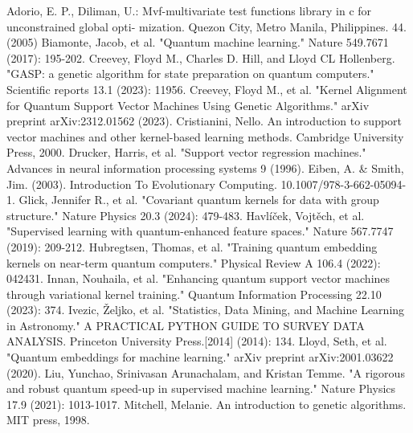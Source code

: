 \documentclass[12pt]{article}
\begin{document}
\begin{thebibliography}{9}

    Adorio, E. P., Diliman, U.: Mvf-multivariate test functions library in c for unconstrained global opti-
mization. Quezon City, Metro Manila, Philippines. 44. (2005)
    Biamonte, Jacob, et al. "Quantum machine learning." Nature 549.7671 (2017): 195-202.
    Creevey, Floyd M., Charles D. Hill, and Lloyd CL Hollenberg. "GASP: a genetic algorithm for state preparation on quantum computers." Scientific reports 13.1 (2023): 11956.
    Creevey, Floyd M., et al. "Kernel Alignment for Quantum Support Vector Machines Using Genetic Algorithms." arXiv preprint arXiv:2312.01562 (2023).
    Cristianini, Nello. An introduction to support vector machines and other kernel-based learning methods. Cambridge University Press, 2000.    
    Drucker, Harris, et al. "Support vector regression machines." Advances in neural information processing systems 9 (1996).
    Eiben, A. \& Smith, Jim. (2003). Introduction To Evolutionary Computing. 10.1007/978-3-662-05094-1.     
    Glick, Jennifer R., et al. "Covariant quantum kernels for data with group structure." Nature Physics 20.3 (2024): 479-483.    
    Havlíček, Vojtěch, et al. "Supervised learning with quantum-enhanced feature spaces." Nature 567.7747 (2019): 209-212.    
    Hubregtsen, Thomas, et al. "Training quantum embedding kernels on near-term quantum computers." Physical Review A 106.4 (2022): 042431.    
    Innan, Nouhaila, et al. "Enhancing quantum support vector machines through variational kernel training." Quantum Information Processing 22.10 (2023): 374.    
    Ivezic, Željko, et al. "Statistics, Data Mining, and Machine Learning in Astronomy." A PRACTICAL PYTHON GUIDE TO SURVEY DATA ANALYSIS. Princeton University Press.[2014] (2014): 134.    
    Lloyd, Seth, et al. "Quantum embeddings for machine learning." arXiv preprint arXiv:2001.03622 (2020).    
    Liu, Yunchao, Srinivasan Arunachalam, and Kristan Temme. "A rigorous and robust quantum speed-up in supervised machine learning." Nature Physics 17.9 (2021): 1013-1017.    
    Mitchell, Melanie. An introduction to genetic algorithms. MIT press, 1998.    

\end{thebibliography}
\end{document}
